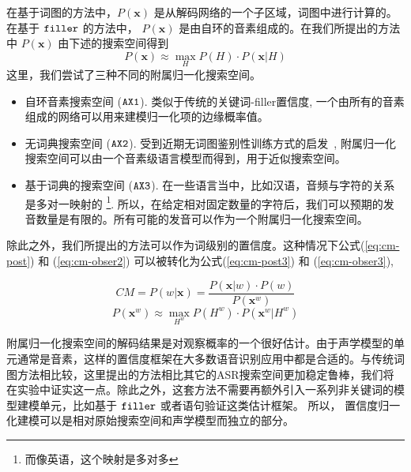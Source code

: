  在基于词图的方法中，$P(\mathbf{x})$ 是从解码网络的一个子区域，词图中进行计算的。在基于 $\tt filler$ 的方法中， $P(\mathbf{x})$ 是由自环的音素组成的。在我们所提出的方法中 $P(\mathbf{x})$ 由下述的搜索空间得到
 \begin{equation}\label{eq:cm-obser2}
 P(\mathbf{x})\approx \max_H P(H) \cdot  P(\mathbf{x}|H)
 \end{equation}
 这里，我们尝试了三种不同的附属归一化搜索空间。
 \begin{itemize}
     \item 自环音素搜索空间 ($\tt AX1$). 类似于传统的关键词-filler置信度\cite{young1994detecting},  一个由所有的音素组成的网络可以用来建模归一化项的边缘概率值。

     \item 无词典搜索空间 ($\tt AX2 $). 受到近期无词图鉴别性训练方式的启发~\cite{povey2016purely},  附属归一化搜索空间可以由一个音素级语言模型而得到，用于近似搜索空间。

     \item 基于词典的搜索空间 ($\tt AX3 $). 在一些语言当中，比如汉语，音频与字符的关系是多对一映射的 \footnote{而像英语，这个映射是多对多}. 所以，在给定相对固定数量的字符后，我们可以预期的发音数量是有限的。所有可能的发音可以作为一个附属归一化搜索空间。
 \end{itemize}
 除此之外，我们所提出的方法可以作为词级别的置信度。这种情况下公式(\ref{eq:cm-post}) 和 (\ref{eq:cm-obser2}) 可以被转化为公式(\ref{eq:cm-post3}) 和 (\ref{eq:cm-obser3}),

 \begin{equation}\label{eq:cm-post3}
        CM=P(w|\mathbf{x}) =
         \frac{P(\mathbf{x}|w)\cdot P(w)}{P(\mathbf{x}^{w})}
  \end{equation}
 \begin{equation}\label{eq:cm-obser3}
 P(\mathbf{x}^{w})\approx \max_{H^{w}} P(H^{w}) \cdot  P(\mathbf{x}^{w}|H^{w})
 \end{equation}
 
 附属归一化搜索空间的解码结果是对观察概率的一个很好估计。由于声学模型的单元通常是音素，这样的置信度框架在大多数语音识别应用中都是合适的。与传统词图方法相比较，这里提出的方法相比其它的ASR搜索空间更加稳定鲁棒，我们将在实验中证实这一点。除此之外，这套方法不需要再额外引入一系列非关键词的模型建模单元，比如基于 $\tt filler$ 或者语句验证这类估计框架。
 所以， 置信度归一化建模可以是相对原始搜索空间和声学模型而独立的部分。


